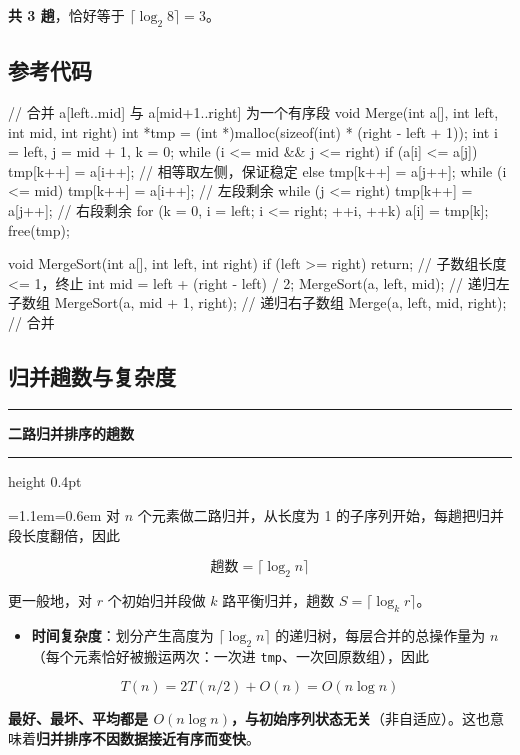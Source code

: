 \documentclass[11pt,openany,UTF8]{ctexbook}
\newcommand{\callouthead}[2]{%
  \par\addvspace{7pt}\noindent
  {\color{#1}\rule[-0.15em]{3pt}{1.05em}}\hspace{0.5em}%
  {\bfseries\color{#1}#2}\par\nobreak\vspace{-0.35em}%
  {\color{rulesep}\hrule height 0.4pt}\nobreak\vspace{0.45em}%
  \begingroup\small\setlength{\parindent}{0pt}%
  \leftskip=1.1em\rightskip=0.6em\noindent\ignorespaces}
\newcommand{\calloutend}{\par\endgroup\addvspace{7pt}}
\newenvironment{callkey}[1]{\callouthead{keybar}{#1}}{\calloutend}
\begin{document}
\textbf{共 3 趟}，恰好等于 $\lceil\log_2 8\rceil=3$。

\subsection{参考代码}

\begin{codebox}
// 合并 a[left..mid] 与 a[mid+1..right] 为一个有序段
void Merge(int a[], int left, int mid, int right) {
    int *tmp = (int *)malloc(sizeof(int) * (right - left + 1));
    int i = left, j = mid + 1, k = 0;
    while (i <= mid && j <= right)
        if (a[i] <= a[j]) tmp[k++] = a[i++];   // 相等取左侧，保证稳定
        else              tmp[k++] = a[j++];
    while (i <= mid)   tmp[k++] = a[i++];      // 左段剩余
    while (j <= right) tmp[k++] = a[j++];      // 右段剩余
    for (k = 0, i = left; i <= right; ++i, ++k) a[i] = tmp[k];
    free(tmp);
}

void MergeSort(int a[], int left, int right) {
    if (left >= right) return;                 // 子数组长度 <= 1，终止
    int mid = left + (right - left) / 2;
    MergeSort(a, left, mid);                   // 递归左子数组
    MergeSort(a, mid + 1, right);              // 递归右子数组
    Merge(a, left, mid, right);                // 合并
}
\end{codebox}

\subsection{归并趟数与复杂度}

\begin{callkey}{二路归并排序的趟数}
对 $n$ 个元素做二路归并，从长度为 1 的子序列开始，每趟把归并段长度翻倍，因此

\[\text{趟数}=\lceil\log_2 n\rceil\]

更一般地，对 $r$ 个初始归并段做 $k$ 路平衡归并，趟数 $S=\lceil\log_k r\rceil$。

\end{callkey}

\begin{itemize}
\item \textbf{时间复杂度}：划分产生高度为 $\lceil\log_2 n\rceil$ 的递归树，每层合并的总操作量为 $n$（每个元素恰好被搬运两次：一次进 \texttt{tmp}、一次回原数组），因此
\end{itemize}
\[T(n)=2T(n/2)+O(n)=O(n\log n)\]

\textbf{最好、最坏、平均都是 $O(n\log n)$，与初始序列状态无关}（非自适应）。这也意味着\textbf{归并排序不因数据接近有序而变快}。
\end{document}
